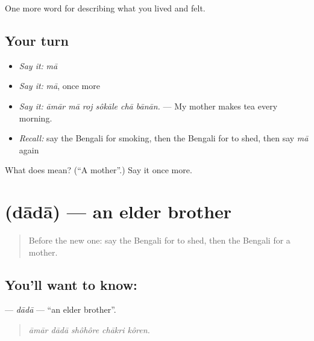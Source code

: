 \begin{grammarlens}[title={What you've built}]
One more word for describing what you lived and felt.
\end{grammarlens}

\subsection*{Your turn}
\begin{itemize}
\raggedright
  \item \emph{Say it:} \emph{mā}
  \item \emph{Say it:} \emph{mā}, once more
  \item \emph{Say it:} \emph{āmār mā roj sôkāle chā bānān.} — My mother makes tea every morning.
  \item \emph{Recall:} say the Bengali for smoking, then the Bengali for to shed, then say \emph{mā} again
\end{itemize}

\begin{tcolorbox}[breakable,colback=teal!4,colframe=teal!35!black,title={Before you move on}]
What does  mean? (\textquotedblleft{}A mother\textquotedblright{}.) Say it once more.
\end{tcolorbox}
\section[\texorpdfstring{\bn{দাদা} (dādā)}{দাদা (dādā)}]{ (dādā) — an elder brother}

\label{lesson:BN-C481-dada}



\begin{quote}
Before the new one: say the Bengali for to shed, then the Bengali for a mother.
\end{quote}

\subsection*{You'll want to know: }
\textbf{} — \emph{dādā} — \textquotedblleft{}an elder brother\textquotedblright{}.

\begin{quote}
    
\end{quote}

\begin{quote}
\emph{āmār dādā shôhôre chākri kôren.}
\end{quote}

